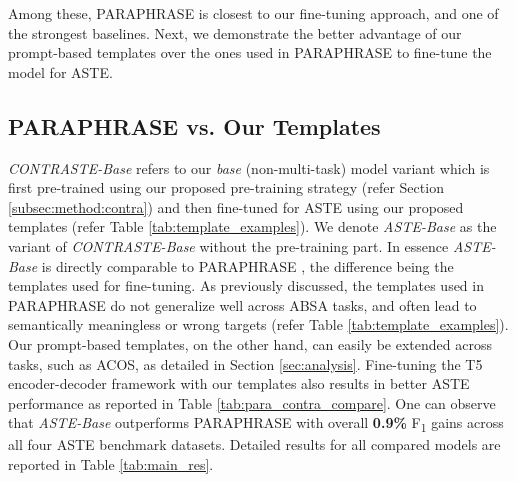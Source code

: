 Among these, PARAPHRASE is closest to our fine-tuning approach, and one of the strongest baselines.
Next, we demonstrate the better advantage of our prompt-based templates over the ones used in PARAPHRASE to fine-tune the model for ASTE.

\subsection{PARAPHRASE vs. Our Templates}
\label{subsec:exp:template_compare}

\begin{table}[!t]
    \centering
    \caption{Test F\textsubscript{1} scores on ASTE. Comparing PARAPHRASE with our non-multi-task model variants.}
    \label{tab:para_contra_compare}
\end{table}

\textit{CONTRASTE-Base} refers to our \textit{base} (non-multi-task) model variant which is first pre-trained using our proposed pre-training strategy (refer Section \ref{subsec:method:contra}) and then fine-tuned for ASTE using our proposed templates (refer Table \ref{tab:template_examples}). 
We denote \textit{ASTE-Base} as the variant of \textit{CONTRASTE-Base} without the pre-training part. 
In essence \textit{ASTE-Base} is directly comparable to PARAPHRASE \cite{zhang-etal-2021-aspect-sentiment}, the difference being the templates used for fine-tuning. 
As previously discussed, the templates used in PARAPHRASE do not generalize well across ABSA tasks, and often lead to semantically meaningless or wrong targets (refer Table \ref{tab:template_examples}). 
Our prompt-based templates, on the other hand, can easily be extended across tasks, such as ACOS, as detailed in Section \ref{sec:analysis}. 
Fine-tuning the T5 encoder-decoder framework with our templates also results in better ASTE performance as reported in Table \ref{tab:para_contra_compare}.
One can observe that \textit{ASTE-Base} outperforms PARAPHRASE with overall \textbf{0.9\%} F\textsubscript{1} gains across all four ASTE benchmark datasets.
Detailed results for all compared models are reported in Table \ref{tab:main_res}.


